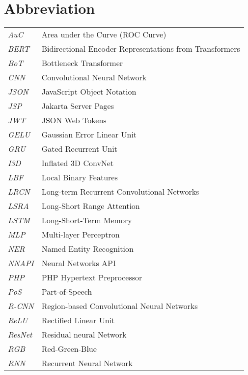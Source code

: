\newpage
\makeatletter
\let\mcnewpage=\newpage
\newcommand{\TrickSupertabularIntoMulticols}{%
  \renewcommand\newpage{%
    \if@firstcolumn
      \hrule width\linewidth height0pt
      \columnbreak
    \else
      \mcnewpage
    \fi
  }%
}
\makeatother
\chapter{Abbreviation}
\begin{changemargin}{-0.5cm}{0cm}
\begin{multicols*}{2}
\TrickSupertabularIntoMulticols
\begin{supertabular}{>{\em}lp{6.2cm}}
AuC & Area under the Curve (ROC Curve) \\ [.5em]
BERT & Bidirectional Encoder Representations from Transformers \\ [.5em]
BoT & Bottleneck Transformer \\ [.5em]
CNN & Convolutional Neural Network \\ [.5em]
JSON & JavaScript Object Notation \\ [.5em]
JSP & Jakarta Server Pages \\ [.5em]
JWT & JSON Web Tokens \\ [.5em]
GELU & Gaussian Error Linear Unit \\ [.5em]
GRU & Gated Recurrent Unit \\ [.5em]
I3D & Inflated 3D ConvNet \\ [.5em]
LBF & Local Binary Features \\ [.5em]
LRCN & Long-term Recurrent Convolutional Networks \\ [.5em]
LSRA & Long-Short Range Attention \\ [.5em]
LSTM & Long-Short-Term Memory \\ [.5em]
MLP & Multi-layer Perceptron \\ [.5em]
NER & Named Entity Recognition \\ [.5em]
NNAPI & Neural Networks API \\ [.5em]
PHP & PHP Hypertext Preprocessor \\ [.5em]
PoS & Part-of-Speech \\ [.5em]
R-CNN & Region-based Convolutional Neural Networks \\ [.5em]
ReLU & Rectified Linear Unit \\ [.5em]
ResNet & Residual neural Network \\ [.5em]
RGB & Red-Green-Blue \\ [.5em]
RNN & Recurrent Neural Network \\ [.5em]

\end{supertabular}
\end{multicols*}
\end{changemargin}
